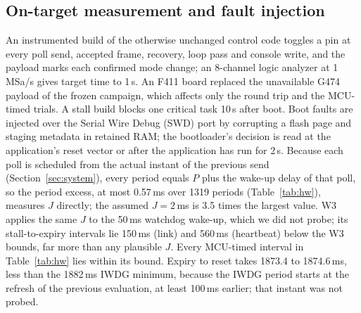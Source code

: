 \documentclass[conference,a4paper]{IEEEtran}
\begin{document}
\subsection{On-target measurement and fault injection}
\label{sec:hw}
An instrumented build of the otherwise unchanged control code toggles a pin at every poll send, accepted frame, recovery, loop pass and console write, and the payload marks each confirmed mode change; an 8-channel logic analyzer at 1\,MSa/s gives target time to 1\,\textmu s. An F411 board replaced the unavailable G474 payload of the frozen campaign, which affects only the round trip and the MCU-timed trials. A stall build blocks one critical task 10\,s after boot. Boot faults are injected over the Serial Wire Debug (SWD) port by corrupting a flash page and staging metadata in retained RAM; the bootloader's decision is read at the application's reset vector or after the application has run for 2\,s. Because each poll is scheduled from the actual instant of the previous send (Section~\ref{sec:system}), every period equals $P$ plus the wake-up delay of that poll, so the period excess, at most 0.57\,ms over 1319 periods (Table~\ref{tab:hw}), measures $J$ directly; the assumed $J{=}2$\,ms is 3.5 times the largest value. W3 applies the same $J$ to the 50\,ms watchdog wake-up, which we did not probe; its stall-to-expiry intervals lie 150\,ms (link) and 560\,ms (heartbeat) below the W3 bounds, far more than any plausible $J$. Every MCU-timed interval in Table~\ref{tab:hw} lies within its bound. Expiry to reset takes 1873.4 to 1874.6\,ms, less than the 1882\,ms IWDG minimum, because the IWDG period starts at the refresh of the previous evaluation, at least 100\,ms earlier; that instant was not probed.
\end{document}
